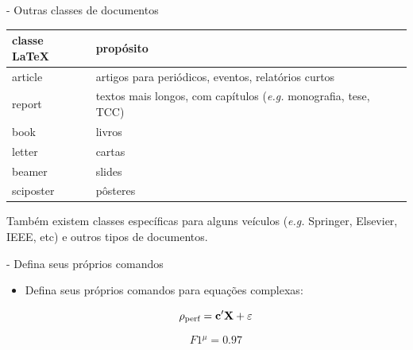 \documentclass[xcolor=table]{beamer}
\begin{document}
\begin{frame}[fragile]{\insertsubsection{} - Outras classes de documentos}
	\begin{center}
	  \begin{tabular}{l|p{}}
	     \hline \hline
	     classe \LaTeX &  prop\'osito \\
	     \hline \hline
	     article &  artigos para periódicos, eventos, relatórios curtos \\
	     report  & textos mais longos, com capítulos (\emph{e.g.} monografia, tese, TCC)\\
	     book    & livros \\
	     letter  & cartas \\
	     beamer  &   slides \\
	     sciposter &        pôsteres \\
	     \hline
	  \end{tabular}
	\end{center}
   Também existem classes específicas para alguns veículos  (\emph{e.g.}
  Springer, Elsevier, IEEE, etc) e outros tipos de documentos.
\end{frame}

		
\begin{frame}[fragile]{\insertsubsection{} - Defina seus próprios comandos}
	\begin{itemize}
		\item Defina seus próprios comandos para equações complexas:
		\begin{exampletwouptiny}
			\newcommand{\rperf}{%
			  \rho_{\text{perf}}}
			
			\newcommand{\fm}{
			  \textit{F1$^\mu$}}

			$$
			\rperf = {\bf c}'{\bf X} + \varepsilon
			$$
			
			$$ \fm = 0.97 $$

		\end{exampletwouptiny}
	\end{itemize}
\end{frame}
\end{document}

